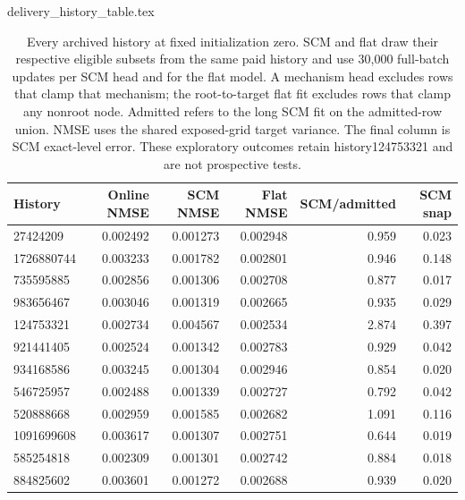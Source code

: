 \begin{filecontents*}[overwrite]{delivery_history_table.tex}
\begin{table}[ht]
\centering\small
\begin{tabular}{lrrrrr}
\toprule
History & Online NMSE & SCM NMSE & Flat NMSE & SCM/admitted & SCM snap\\
\midrule
27424209 & 0.002492 & 0.001273 & 0.002948 & 0.959 & 0.023\\
1726880744 & 0.003233 & 0.001782 & 0.002801 & 0.946 & 0.148\\
735595885 & 0.002856 & 0.001306 & 0.002708 & 0.877 & 0.017\\
983656467 & 0.003046 & 0.001319 & 0.002665 & 0.935 & 0.029\\
124753321 & 0.002734 & 0.004567 & 0.002534 & 2.874 & 0.397\\
921441405 & 0.002524 & 0.001342 & 0.002783 & 0.929 & 0.042\\
934168586 & 0.003245 & 0.001304 & 0.002946 & 0.854 & 0.020\\
546725957 & 0.002488 & 0.001339 & 0.002727 & 0.792 & 0.042\\
520888668 & 0.002959 & 0.001585 & 0.002682 & 1.091 & 0.116\\
1091699608 & 0.003617 & 0.001307 & 0.002751 & 0.644 & 0.019\\
585254818 & 0.002309 & 0.001301 & 0.002742 & 0.884 & 0.018\\
884825602 & 0.003601 & 0.001272 & 0.002688 & 0.939 & 0.020\\
\bottomrule
\end{tabular}
\caption{Every archived history at fixed initialization zero. SCM and flat draw their respective eligible subsets from the same paid history and use 30,000 full-batch updates per SCM head and for the flat model. A mechanism head excludes rows that clamp that mechanism; the root-to-target flat fit excludes rows that clamp any nonroot node. Admitted refers to the long SCM fit on the admitted-row union. NMSE uses the shared exposed-grid target variance. The final column is SCM exact-level error. These exploratory outcomes retain history124753321 and are not prospective tests.}
\label{tab:attribution-histories}
\end{table}
\end{filecontents*}
